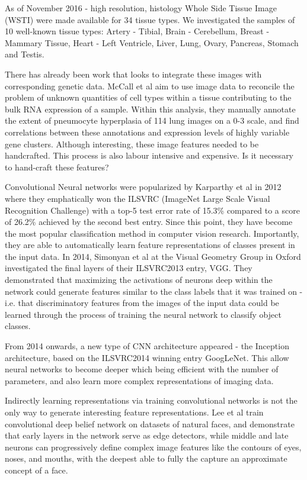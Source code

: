 \documentclass[graybox]{svmult}
\begin{document}
As of November 2016 - high resolution, histology Whole Side Tissue Image (WSTI) were made available for 34 tissue types. We investigated the samples of 10 well-known tissue types: Artery - Tibial, Brain - Cerebellum, Breast - Mammary Tissue, Heart - Left Ventricle, Liver, Lung, Ovary, Pancreas, Stomach and Testis.

There has already been work that looks to integrate these images with corresponding genetic data.  McCall et al \cite{complex-sources-of-variation} aim to use image data to reconcile the problem of unknown quantities of cell types within a tissue contributing to the bulk RNA expression of a sample. Within this analysis, they manually annotate the extent of pneumocyte hyperplasia of 114 lung images on a 0-3 scale, and find correlations between these annotations and expression levels of highly variable gene clusters. Although interesting, these image features needed to be handcrafted. This process is also labour intensive and expensive. Is it necessary to hand-craft these features?

Convolutional Neural networks were popularized by Karparthy et al in 2012 where they emphatically won the ILSVRC (ImageNet Large Scale Visual Recognition Challenge) with a top-5 test error rate of 15.3\% compared to a score of 26.2\% achieved by the second best entry. Since this point, they have become the most popular classification method in computer vision research. Importantly, they  are able to automatically learn feature representations of classes present in the input data. In 2014, Simonyan et al \cite{deep-inside-convolutional-networks} at the Visual Geometry Group in Oxford investigated the final layers of their ILSVRC2013 entry, VGG. They demonstrated that maximizing the activations of neurons deep within the network could generate features similar to the class labels that it was trained on - i.e. that discriminatory features from the images of the input data could be learned through the process of training the neural network to classify object classes.

From 2014 onwards, a new type of CNN architecture appeared - the Inception architecture, based on the ILSVRC2014 winning entry GoogLeNet. This allow neural networks to become deeper which being efficient with the number of parameters, and also learn more complex representations of imaging data.

Indirectly learning representations via training convolutional networks is not the only way to generate interesting feature representations. Lee et al \cite{scalable-unsupervised-learning} train convolutional deep belief network on datasets of natural faces, and demonstrate that early layers in the network serve as edge detectors, while middle and late neurons can progressively define complex image features like the contours of eyes, noses, and mouths, with the deepest able to fully the capture an approximate concept of a face.
\end{document}
